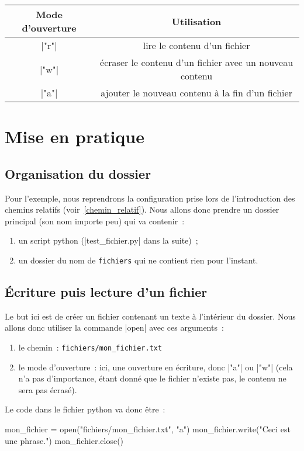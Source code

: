 	\begin{tabular}{|c|c|} \hline
		Mode d'ouverture & Utilisation \\ \hline \hline
		\python|"r"| & lire le contenu d'un fichier \\ \hline
		\python|"w"| & écraser le contenu d'un fichier avec un nouveau contenu \\ \hline
		\python|"a"| & ajouter le nouveau contenu à la fin d'un fichier \\ \hline
	\end{tabular}

\section{Mise en pratique}
	
	\subsection{Organisation du dossier}

		Pour l'exemple, nous reprendrons la configuration prise lors de l'introduction des chemins relatifs (voir~\ref{chemin_relatif}).
		Nous allons donc prendre un dossier principal (son nom importe peu) qui va contenir~:
		\begin{enumerate}
			\item un script python (\python|test_fichier.py| dans la suite)~;
			\item un dossier du nom de \verb|fichiers| qui ne contient rien pour l'instant.
		\end{enumerate}
		
	\subsection{Écriture puis lecture d'un fichier}
		
		Le but ici est de créer un fichier contenant un texte à l'intérieur du dossier.
		Nous allons donc utiliser la commande \python|open| avec ces arguments~:
		\begin{enumerate}
			\item le chemin~: \verb|fichiers/mon_fichier.txt|
			\item le mode d'ouverture~: ici, une ouverture en écriture, donc \python|"a"| ou \python|"w"| (cela n'a pas d'importance, étant donné que le fichier n'existe pas, le contenu ne sera pas écrasé).
		\end{enumerate}

		Le code dans le fichier python va donc être~:
		\begin{pythoncode}
			mon_fichier = open("fichiers/mon_fichier.txt", "a")
			mon_fichier.write("Ceci est une phrase.")
			mon_fichier.close()
		\end{pythoncode}

